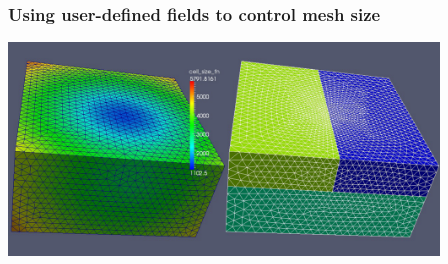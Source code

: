 \documentclass{beamer}
\begin{document}
\begin{frame}
  \frametitle{Using user-defined fields to control mesh size}
 
  \vfill
  \begin{center}
    \includegraphics[width=4.5in]{figs/cellsize_mesh_analyticfn}
  \end{center}
  \vfill
 
\end{frame}
 

\end{document}
